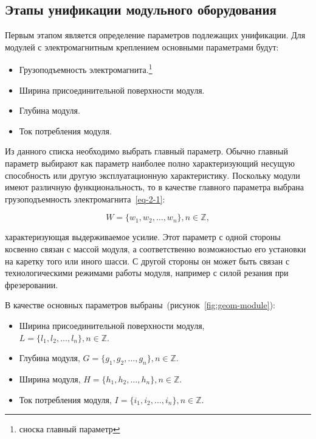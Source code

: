 \subsection{Этапы унификации модульного оборудования}

Первым этапом является определение параметров подлежащих унификации. Для модулей с электромагнитным креплением основными параметрами будут:

\begin{itemize}
	\item Грузоподъемность электромагнита.\footnote{сноска главный параметр}
	\item Ширина присоединительной поверхности модуля. 
	\item Глубина модуля.
	\item Ток потребления модуля.
\end{itemize}


Из данного списка необходимо выбрать главный параметр. Обычно главный параметр выбирают как параметр наиболее полно характеризующий несущую способность или другую эксплуатационную характеристику. Поскольку модули имеют различную функциональность, то в качестве главного параметра выбрана грузоподъемность электромагнита~\cref{eq-2-1}:

\begin{equation}
W = \{w_1, w_2, \ldots, w_n\}, n \in \mathbb{Z},
\label{eq-2-1}
\end{equation}

\noindent характеризующая выдерживаемое усилие. Этот параметр с одной стороны косвенно связан с массой модуля, а соответственно возможностью его установки на каретку того или иного шасси. С другой стороны он может быть связан с технологическими режимами работы модуля, например с силой резания при фрезеровании.

В качестве основных параметров выбраны~(рисунок~\cref{fig:geom-module}):

\begin{itemize}
	\item Ширина присоединительной поверхности модуля,\\$L = \{l_1, l_2, \ldots, l_n\}, n \in \mathbb{Z}$.
	\item Глубина модуля, $G = \{g_1, g_2, \ldots, g_n\}, n \in \mathbb{Z}$.
	\item Ширина модуля, $H = \{h_1, h_2, \ldots, h_n\}, n \in \mathbb{Z}$.
	\item Ток потребления модуля, $I = \{i_1, i_2, \ldots, i_n\}, n \in \mathbb{Z}$.
\end{itemize}

